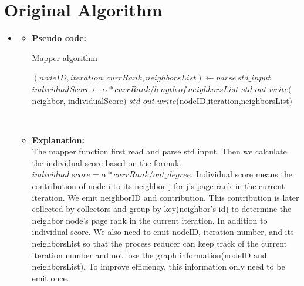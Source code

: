 \section{Original Algorithm}
\medskip
\begin{itemize}

    \item {}
    \begin{itemize}
    \item \textbf{Pseudo code:}
    
    \begin{minipage}{\linewidth}
    \begin{algorithm}[H]
    \caption{Mapper algorithm}\label{process}
    \begin{algorithmic}[1]
    \State $(nodeID, iteration, currRank, neighborsList)\gets parse\, std\_input$    
    \State$individualScore \gets\alpha * currRank/length\,of\, neighborsList$
    \State $std\_out.write($neighbor, individualScore$)$
    \EndFor
    \State $std\_out.write($nodeID,iteration,neighborsList$)$
    \EndProcedure
    \end{algorithmic}
    \end{algorithm}
    \end{minipage} \\[1em]
    
    
    
    
    
    
    
    \item \textbf{Explanation:}\\
    The mapper function first read and parse std input. Then we calculate the individual score based on the formula \(individual\ score = \alpha * currRank / out\_degree \). Individual score means the contribution of node i to its neighbor j for j's page rank in the current iteration. We emit neighborID and contribution. This contribution is later collected by collectors and group by key(neighbor's id) to determine the neighbor node's page rank in the current iteration. In addition to individual score. We also need to emit nodeID, iteration number, and its neighborsList so that the process reducer can keep track of the current iteration number and not lose the graph information(nodeID and neighborsList). To improve efficiency, this information only need to be emit once.
    \end{itemize}



\end{itemize}

